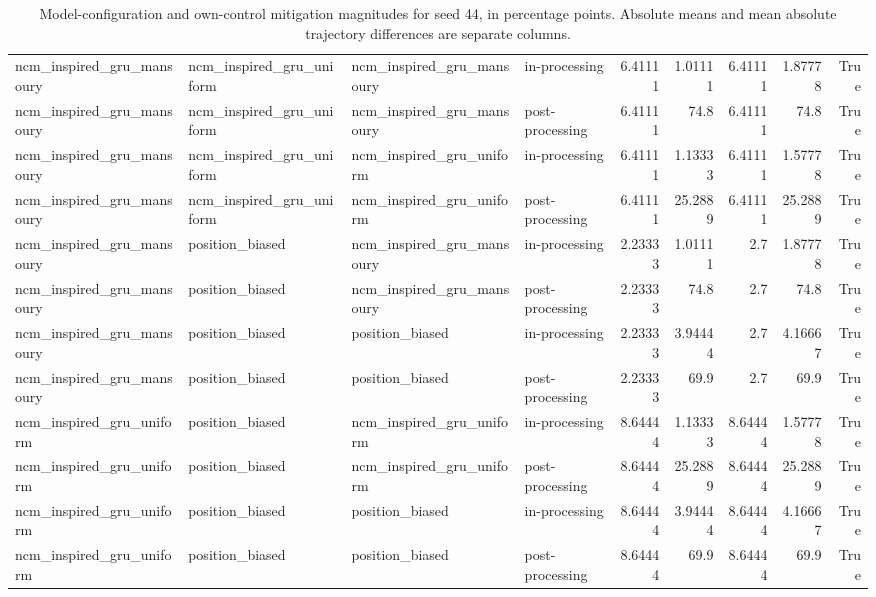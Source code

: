 \begin{table}[htbp!]
\begin{tabular}{llllrrrrr}
ncm\_inspired\_gru\_mansoury & ncm\_inspired\_gru\_uniform & ncm\_inspired\_gru\_mansoury & in-processing & 6.41111 & 1.01111 & 6.41111 & 1.87778 & True \\
ncm\_inspired\_gru\_mansoury & ncm\_inspired\_gru\_uniform & ncm\_inspired\_gru\_mansoury & post-processing & 6.41111 & 74.8 & 6.41111 & 74.8 & True \\
ncm\_inspired\_gru\_mansoury & ncm\_inspired\_gru\_uniform & ncm\_inspired\_gru\_uniform & in-processing & 6.41111 & 1.13333 & 6.41111 & 1.57778 & True \\
ncm\_inspired\_gru\_mansoury & ncm\_inspired\_gru\_uniform & ncm\_inspired\_gru\_uniform & post-processing & 6.41111 & 25.2889 & 6.41111 & 25.2889 & True \\
ncm\_inspired\_gru\_mansoury & position\_biased & ncm\_inspired\_gru\_mansoury & in-processing & 2.23333 & 1.01111 & 2.7 & 1.87778 & True \\
ncm\_inspired\_gru\_mansoury & position\_biased & ncm\_inspired\_gru\_mansoury & post-processing & 2.23333 & 74.8 & 2.7 & 74.8 & True \\
ncm\_inspired\_gru\_mansoury & position\_biased & position\_biased & in-processing & 2.23333 & 3.94444 & 2.7 & 4.16667 & True \\
ncm\_inspired\_gru\_mansoury & position\_biased & position\_biased & post-processing & 2.23333 & 69.9 & 2.7 & 69.9 & True \\
ncm\_inspired\_gru\_uniform & position\_biased & ncm\_inspired\_gru\_uniform & in-processing & 8.64444 & 1.13333 & 8.64444 & 1.57778 & True \\
ncm\_inspired\_gru\_uniform & position\_biased & ncm\_inspired\_gru\_uniform & post-processing & 8.64444 & 25.2889 & 8.64444 & 25.2889 & True \\
ncm\_inspired\_gru\_uniform & position\_biased & position\_biased & in-processing & 8.64444 & 3.94444 & 8.64444 & 4.16667 & True \\
ncm\_inspired\_gru\_uniform & position\_biased & position\_biased & post-processing & 8.64444 & 69.9 & 8.64444 & 69.9 & True \\
\hline
\end{tabular}
\caption{Model-configuration and own-control mitigation magnitudes for seed 44, in percentage points. Absolute means and mean absolute trajectory differences are separate columns.}
\label{chap:results:tab:rq4_model_vs_mitigation_seed_44}
\end{table}
